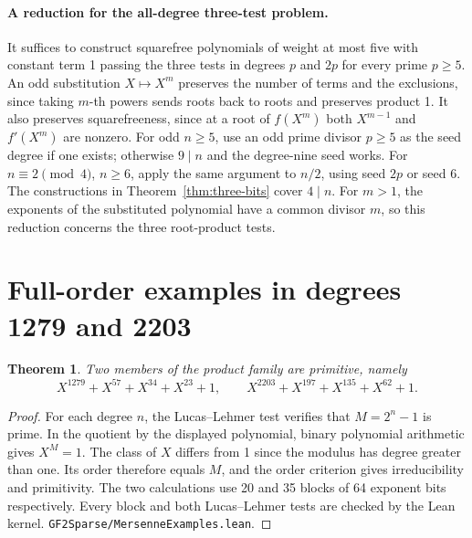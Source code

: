 \documentclass[11pt]{article}
\newtheorem{theorem}{Theorem}
\begin{document}
\paragraph{A reduction for the all-degree three-test problem.}
It suffices to construct squarefree polynomials of weight at most five
with constant term 1 passing the three tests in degrees \(p\) and
\(2p\) for every prime \(p\ge5\). An odd substitution \(X\mapsto X^m\)
preserves the number of terms and the exclusions, since taking
\(m\)-th powers sends roots back to roots and preserves product 1.
It also preserves squarefreeness, since at a root of \(f(X^m)\) both
\(X^{m-1}\) and \(f'(X^m)\) are nonzero. For odd \(n\ge5\),
use an odd prime divisor \(p\ge5\) as the seed degree if one exists;
otherwise \(9\mid n\) and the degree-nine seed works.
For \(n\equiv2\pmod4\), \(n\ge6\), apply the same argument to
\(n/2\), using seed \(2p\) or seed 6. The constructions in
Theorem~\ref{thm:three-bits} cover \(4\mid n\).
For \(m>1\), the exponents of the substituted polynomial have a common
divisor \(m\), so this reduction concerns the three root-product tests.

\section{Full-order examples in degrees 1279 and 2203}
\begin{theorem}\label{thm:mersenne-examples}
Two members of the product family are primitive, namely
\[
 X^{1279}+X^{57}+X^{34}+X^{23}+1,\qquad
 X^{2203}+X^{197}+X^{135}+X^{62}+1 .
\]
\end{theorem}
\begin{proof}
For each degree \(n\), the Lucas--Lehmer test verifies that
\(M=2^n-1\) is prime. In the quotient by the displayed polynomial,
binary polynomial arithmetic gives \(X^M=1\). The class of \(X\)
differs from 1 since the modulus has degree greater than one.
Its order therefore equals \(M\), and the order criterion gives
irreducibility and primitivity. The two calculations use 20 and 35
blocks of 64 exponent bits respectively. Every block and both
Lucas--Lehmer tests are checked by the Lean kernel.
\nolinkurl{GF2Sparse/MersenneExamples.lean}.
\end{proof}
\end{document}
